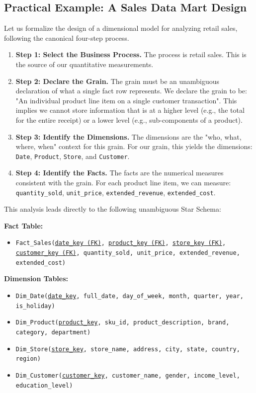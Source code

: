 \begin{description}
\subsection{Practical Example: A Sales Data Mart Design}
Let us formalize the design of a dimensional model for analyzing retail sales, following the canonical four-step process.

\begin{enumerate}
    \item \textbf{Step 1: Select the Business Process.} The process is retail sales. This is the source of our quantitative measurements.
    \item \textbf{Step 2: Declare the Grain.} The grain must be an unambiguous declaration of what a single fact row represents. We declare the grain to be: "An individual product line item on a single customer transaction". This implies we cannot store information that is at a higher level (e.g., the total for the entire receipt) or a lower level (e.g., sub-components of a product).
    \item \textbf{Step 3: Identify the Dimensions.} The dimensions are the "who, what, where, when" context for this grain. For our grain, this yields the dimensions: \texttt{Date}, \texttt{Product}, \texttt{Store}, and \texttt{Customer}.
    \item \textbf{Step 4: Identify the Facts.} The facts are the numerical measures consistent with the grain. For each product line item, we can measure: \texttt{quantity\_sold}, \texttt{unit\_price}, \texttt{extended\_revenue}, \texttt{extended\_cost}.
\end{enumerate}

\noindent This analysis leads directly to the following unambiguous Star Schema:

\noindent\textbf{Fact Table:}
\begin{itemize}
    \item \texttt{Fact\_Sales(\underline{date\_key (FK)}, \underline{product\_key (FK)}, \underline{store\_key (FK)}, \underline{customer\_key (FK)}, quantity\_sold, unit\_price, extended\_revenue, extended\_cost)}
\end{itemize}
\noindent\textbf{Dimension Tables:}
\begin{itemize}
    \item \texttt{Dim\_Date(\underline{date\_key}, full\_date, day\_of\_week, month, quarter, year, is\_holiday)}
    \item \texttt{Dim\_Product(\underline{product\_key}, sku\_id, product\_description, brand, category, department)}
    \item \texttt{Dim\_Store(\underline{store\_key}, store\_name, address, city, state, country, region)}
    \item \texttt{Dim\_Customer(\underline{customer\_key}, customer\_name, gender, income\_level, education\_level)}
\end{itemize}


\end{description}
